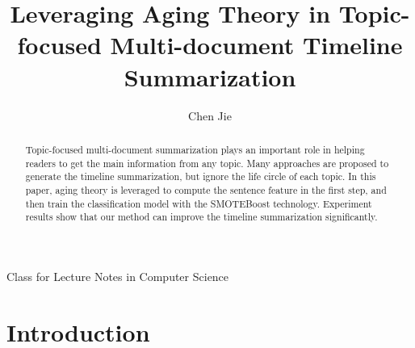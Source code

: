 \documentclass{llncs}
\begin{document}
{\LaTeXe{} Class for Lecture Notes in Computer Science}
\thispagestyle{empty}
\vspace{2pt}
\vfill

%
\title {Leveraging  Aging Theory in Topic-focused Multi-document Timeline Summarization} 

\author{Chen Jie}

\maketitle
%
\begin{abstract}

Topic-focused multi-document summarization plays an important role in helping readers to get the main information from any topic. Many approaches are proposed to generate the timeline summarization, but ignore the life circle of each topic. In this paper, aging theory is leveraged to compute the sentence feature in the first step, and then train the classification model with the SMOTEBoost technology. %
Experiment results show that our method can improve the timeline summarization significantly.

\end{abstract}

%
\section{Introduction}
%


\end{document}

